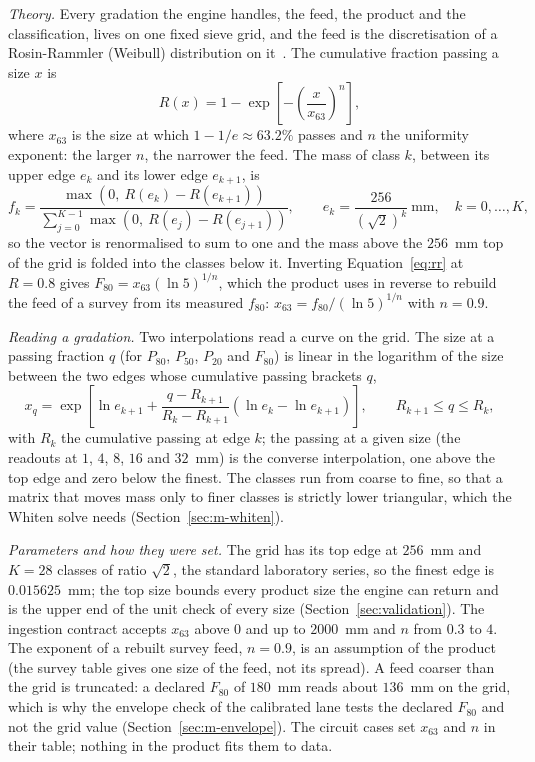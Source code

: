 \emph{Theory.} Every gradation the engine handles, the feed, the product and the classification, lives on one fixed sieve grid, and
the feed is the discretisation of a Rosin-Rammler (Weibull) distribution on it~\cite{rosin1933}. The cumulative fraction passing a
size $x$ is
\begin{equation}
R(x) = 1 - \exp\!\left[-\left(\frac{x}{x_{63}}\right)^{n}\right],
\label{eq:rr}
\end{equation}
where $x_{63}$ is the size at which $1-1/e\approx63.2\%$ passes and $n$ the uniformity exponent: the larger $n$, the narrower the
feed. The mass of class $k$, between its upper edge $e_k$ and its lower edge $e_{k+1}$, is
\begin{equation}
f_k = \frac{\max\!\left(0,\ R(e_k) - R(e_{k+1})\right)}{\sum_{j=0}^{K-1}\max\!\left(0,\ R(e_j) - R(e_{j+1})\right)},
\qquad e_k = \frac{256}{(\sqrt2)^{k}}\ \mathrm{mm},\quad k = 0,\dots,K,
\label{eq:feedmass}
\end{equation}
so the vector is renormalised to sum to one and the mass above the $256$~mm top of the grid is folded into the classes below it.
Inverting Equation~\eqref{eq:rr} at $R=0.8$ gives $F_{80}=x_{63}(\ln 5)^{1/n}$, which the product uses in reverse to rebuild the feed
of a survey from its measured $f_{80}$: $x_{63}=f_{80}/(\ln5)^{1/n}$ with $n=0.9$.

\emph{Reading a gradation.} Two interpolations read a curve on the grid. The size at a passing fraction $q$ (for $P_{80}$, $P_{50}$,
$P_{20}$ and $F_{80}$) is linear in the logarithm of the size between the two edges whose cumulative passing brackets $q$,
\begin{equation}
x_q = \exp\!\left[\ln e_{k+1} + \frac{q - R_{k+1}}{R_k - R_{k+1}}\left(\ln e_k - \ln e_{k+1}\right)\right],\qquad R_{k+1}\le q\le R_k,
\label{eq:interp}
\end{equation}
with $R_k$ the cumulative passing at edge $k$; the passing at a given size (the readouts at $1$, $4$, $8$, $16$ and $32$~mm) is the
converse interpolation, one above the top edge and zero below the finest. The classes run from coarse to fine, so that a matrix that
moves mass only to finer classes is strictly lower triangular, which the Whiten solve needs (Section~\ref{sec:m-whiten}).

\emph{Parameters and how they were set.} The grid has its top edge at $256$~mm and $K=28$ classes of ratio $\sqrt2$, the standard
laboratory series, so the finest edge is $0.015625$~mm; the top size bounds every product size the engine can return and is the
upper end of the unit check of every size (Section~\ref{sec:validation}). The ingestion contract accepts $x_{63}$ above $0$ and up to
$2000$~mm and $n$ from $0.3$ to $4$. The exponent of a rebuilt survey feed, $n=0.9$, is an assumption of the product (the survey
table gives one size of the feed, not its spread). A feed coarser than the grid is truncated: a declared $F_{80}$ of $180$~mm reads
about $136$~mm on the grid, which is why the envelope check of the calibrated lane tests the declared $F_{80}$ and not the grid value
(Section~\ref{sec:m-envelope}). The circuit cases set $x_{63}$ and $n$ in their table; nothing in the product fits them to data.

